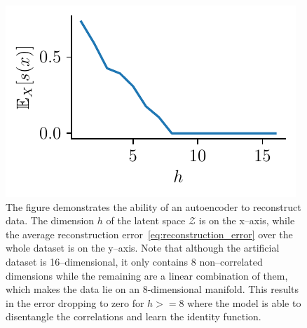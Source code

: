 \begin{figure}
\begin{centering}
\includegraphics[scale=1.0]{data/chapter_intro/ae_reconstruction}\caption{The figure demonstrates the ability of an autoencoder to reconstruct data. The dimension $h$ of the latent space $\mathcal{Z}$ is on the x--axis, while the average reconstruction error~\eqref{eq:reconstruction_error} over the whole dataset is on the y--axis. Note that although the artificial dataset is 16--dimensional, it only contains 8 non--correlated dimensions while the remaining are a linear combination of them, which makes the data lie on an 8-dimensional manifold. This results in the error dropping to zero for $h>=8$ where the model is able to disentangle the correlations and learn the identity function.}
\label{fig:ae_reconstruction}
\par\end{centering}
\end{figure}
